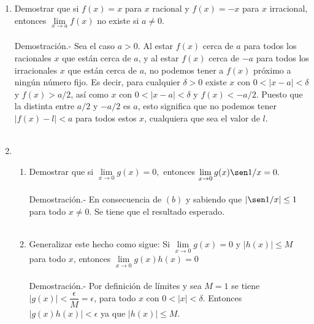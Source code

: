 \begin{enumerate}
\item Demostrar que si $f(x) = x$ para $x$ racional y $f(x) = -x$ para $x$ irracional, entonces $\lim\limits_{x\to a} f(x)$ no existe si $a\neq 0$.\\\\
    Demostración.-\; Sea el caso $a>0$. Al estar $f(x)$ cerca de $a$ para todos los racionales $x$ que están cerca de $a$, y al estar $f(x)$ cerca de $-a$ para todos los irracionales $x$ que están cerca de $a$, no podemos tener a $f(x)$ próximo a ningún número fijo. Es decir, para cualquier $\delta > 0$ existe $x$ con $0<|x-a|<\delta$ y $f(x)>a/2$, así como $x$ con $0<|x-a|<\delta$ y $f(x)<-a/2$. Puesto que la distinta entre $a/2$ y $-a/2$ es $a$, esto significa que no podemos tener $|f(x)-l|<a$ para todos estos $x$, cualquiera que sea el valor de $l$.\\\\

\item 
\begin{enumerate}[\bfseries (a)]
    
    \item Demostrar que si $\lim\limits_{x\to 0} g(x)=0,$ entonces $\lim\limits_{x\to 0}g(x)  \sen 1/x = 0.$\\\\
	Demostración.-\; En consecuencia de $(b)$ y sabiendo que $|\sen 1/x|\leq 1$ para todo $x\neq 0$. Se tiene que el resultado esperado.\\\\

    \item Generalizar este hecho como sigue: Si $\lim\limits_{x\to 0} g(x)=0$ y $|h(x)| \leq M$ para todo $x$, entonces $\lim\limits_{x\to 0} g(x)h(x)=0$\\\\
	Demostración.-\; Por definición de límites y sea $M=1$ se tiene $|g(x)| < \dfrac{\epsilon}{M} = \epsilon$, para todo $x$ con $0<|x|<\delta$. Entonces $|g(x)h(x)|<\epsilon$ ya que $|h(x)|\leq M$.\\\\

\end{enumerate}


\end{enumerate}
